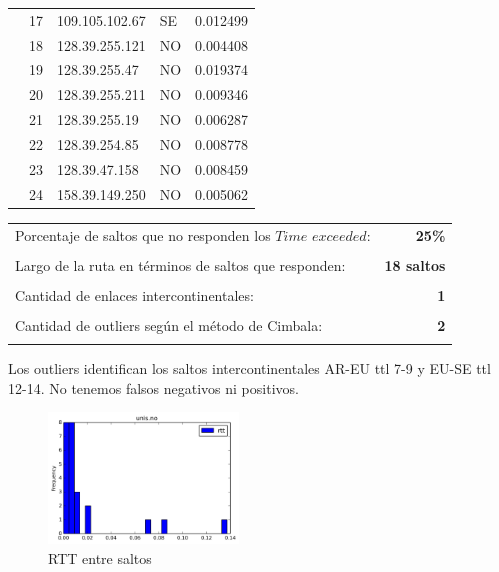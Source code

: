 \begin{center}
{\begin{tabular}{llllr}
        & 17 & 109.105.102.67 & SE &  0.012499 \\
        & 18 & 128.39.255.121 & NO &  0.004408 \\
        & 19 & 128.39.255.47 & NO &  0.019374 \\
        & 20 & 128.39.255.211 & NO &  0.009346 \\
        & 21 & 128.39.255.19 & NO &  0.006287 \\
        & 22 & 128.39.254.85 & NO &  0.008778 \\
        & 23 & 128.39.47.158 & NO &  0.008459 \\
        & 24 & 158.39.149.250 & NO &  0.005062 \\
\bottomrule
\end{tabular}}
\end{center}

\begin{center}
\begin{tabular}{p{6.5cm}r}
Porcentaje de saltos que no responden los $Time$ $exceeded$: & \textbf{25\%} \\ \\ 
Largo de la ruta en términos de saltos que responden: &\textbf{18 saltos} \\ \\
Cantidad de enlaces intercontinentales: & \textbf{1} \\ \\
Cantidad de outliers según el método de Cimbala: & \textbf{2} \\ \\
\end{tabular}
\end{center}

Los outliers identifican los saltos intercontinentales AR-EU ttl 7-9 y EU-SE ttl 12-14. No tenemos falsos negativos ni positivos.

\begin{figure}[H]
  \centering
    \includegraphics[width=0.45\textwidth]{histogramas_rtt/unis-no.png}
  \caption{RTT entre saltos}
  \label{entropia-s}
\end{figure}

